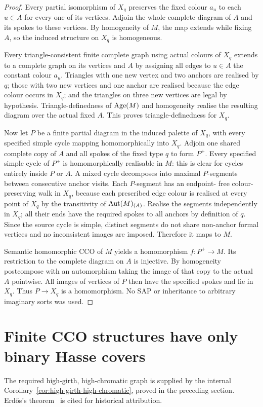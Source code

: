 \begin{proof}
Every partial isomorphism of $X_q$ preserves the fixed colour $a_u$
to each $u\in A$ for every one of its vertices. Adjoin the whole
complete diagram of $A$ and its spokes to these vertices. By
homogeneity of $M$, the map extends while fixing $A$, so the induced
structure on $X_q$ is homogeneous.

Every triangle-consistent finite complete graph using actual colours of
$X_q$ extends to a complete graph on its vertices and $A$ by assigning
all edges to $u\in A$ the constant colour $a_u$. Triangles with one
new vertex and two anchors are realised by $q$; those with two new
vertices and one anchor are realised because the edge colour occurs in
$X_q$; and the triangles on three new vertices are legal by hypothesis.
Triangle-definedness of $\operatorname{Age}(M)$ and homogeneity realise the resulting
diagram over the actual fixed $A$. This proves triangle-definedness for
$X_q$.

Now let $P$ be a finite partial diagram in the induced palette of
$X_q$, with every specified simple cycle mapping homomorphically into
$X_q$. Adjoin one shared complete copy of $A$ and all spokes of the
fixed type $q$ to form $P^+$. Every specified simple cycle of $P^+$
is homomorphically realisable in $M$: this is clear for cycles entirely
inside $P$ or $A$. A mixed cycle decomposes into maximal $P$-segments
between consecutive anchor visits. Each $P$-segment has an endpoint-
free colour-preserving walk in $X_q$, because each prescribed edge colour
is realised at every point of $X_q$ by the transitivity of
$\operatorname{Aut}(M)_{(A)}$. Realise the segments independently in $X_q$;
all their ends have the required spokes to all anchors by definition
of $q$. Since the source cycle is simple, distinct segments do not share
non-anchor formal vertices and no inconsistent images are imposed.
Therefore it maps to $M$.

Semantic homomorphic CCO of $M$ yields a homomorphism $f:P^+\to M$.
Its restriction to the complete diagram on $A$ is injective. By
homogeneity postcompose with an automorphism taking the image of that
copy to the actual $A$ pointwise. All images of vertices of $P$ then
have the specified spokes and lie in $X_q$. Thus $P\to X_q$ is a
homomorphism. No SAP or inheritance to arbitrary imaginary sorts was
used.
\end{proof}

\section{Finite CCO structures have only binary Hasse covers}
The required high-girth, high-chromatic graph is supplied by the internal
Corollary~\ref{cor:high-girth-high-chromatic}, proved in the preceding section.
Erd\H{o}s's theorem~\cite{Erdos1959} is cited for historical attribution.


